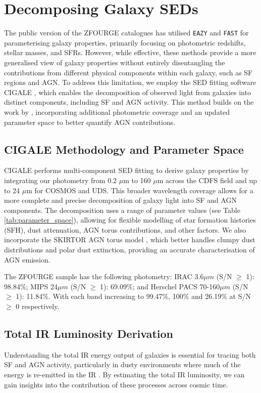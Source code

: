 \section{Decomposing Galaxy SEDs} \label{Sec: CIGALE}
The public version of the ZFOURGE catalogues has utilised \texttt{EAZY} \citep{brammer_eazy_2008} and \texttt{FAST} \citep{kriek_ultra-deep_2009} for parameterising galaxy properties, primarily focusing on photometric redshifts, stellar masses, and SFRs. However, while effective, these methods provide a more generalised view of galaxy properties without entirely disentangling the contributions from different physical components within each galaxy, such as SF regions and AGN. To address this limitation, we employ the SED fitting software CIGALE \citep{boquien_cigale_2019}, which enables the decomposition of observed light from galaxies into distinct components, including SF and AGN activity. This method builds on the work by \cite{cowley_decoupled_2018}, incorporating additional photometric coverage and an updated parameter space to better quantify AGN contributions.

\subsection{CIGALE Methodology and Parameter Space} \label{Sec: CIGALE_Parameters}
CIGALE performs multi-component SED fitting to derive galaxy properties by integrating our photometry from 0.2 $\mu$m to 160 $\mu$m across the CDFS field and up to 24 $\mu$m for COSMOS and UDS. This broader wavelength coverage allows for a more complete and precise decomposition of galaxy light into SF and AGN components. The decomposition uses a range of parameter values (see Table \ref{tab:parameter_space}), allowing for flexible modelling of star formation histories (SFH), dust attenuation, AGN torus contributions, and other factors. We also incorporate the SKIRTOR AGN torus model \citep{stalevski_dust_2016}, which better handles clumpy dust distributions and polar dust extinction, providing an accurate characterisation of AGN emission.

The ZFOURGE sample has the following photometry: IRAC 3.6$\mu m$ (S/N $\geq$ 1): 98.84\%; MIPS 24$\mu m$ (S/N $\geq$ 1): 69.09\%; and Herschel PACS 70-160$\mu m$ (S/N $\geq$ 1): 11.84\%. With each band increasing to 99.47\%, 100\% and 26.19\% at S/N $\geq$ 0 respectively. 

\subsection{Total IR Luminosity Derivation} \label{Sec: IR_Luminosity}
Understanding the total IR energy output of galaxies is essential for tracing both SF and AGN activity, particularly in dusty environments where much of the energy is re-emitted in the IR \citep{fu_decomposing_2010}. By estimating the total IR luminosity, we can gain insights into the contribution of these processes across cosmic time. 

